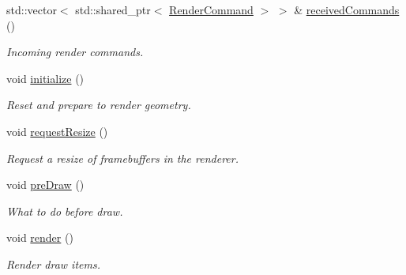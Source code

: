\begin{Indent}
\begin{DoxyCompactItemize}
\mbox{\label{classrev_1_1_main_renderer_a6b64ac62d7d411502a2ad07a2d9382f2}} 
std\+::vector$<$ std\+::shared\+\_\+ptr$<$ \mbox{\hyperlink{classrev_1_1_render_command}{Render\+Command}} $>$ $>$ \& \mbox{\hyperlink{classrev_1_1_main_renderer_a6b64ac62d7d411502a2ad07a2d9382f2}{received\+Commands}} ()
\begin{DoxyCompactList}\small\item\em Incoming render commands. \end{DoxyCompactList}\item 
\mbox{\label{classrev_1_1_main_renderer_ab9f5d1b5292ce45c0298a87463a9073e}} 
void \mbox{\hyperlink{classrev_1_1_main_renderer_ab9f5d1b5292ce45c0298a87463a9073e}{initialize}} ()
\begin{DoxyCompactList}\small\item\em Reset and prepare to render geometry. \end{DoxyCompactList}\item 
\mbox{\label{classrev_1_1_main_renderer_a73507819878d4870570d73689b68f543}} 
void \mbox{\hyperlink{classrev_1_1_main_renderer_a73507819878d4870570d73689b68f543}{request\+Resize}} ()
\begin{DoxyCompactList}\small\item\em Request a resize of framebuffers in the renderer. \end{DoxyCompactList}\item 
\mbox{\label{classrev_1_1_main_renderer_a48de9755d4873f4c031ee3ff19dff142}} 
void \mbox{\hyperlink{classrev_1_1_main_renderer_a48de9755d4873f4c031ee3ff19dff142}{pre\+Draw}} ()
\begin{DoxyCompactList}\small\item\em What to do before draw. \end{DoxyCompactList}\item 
\mbox{\label{classrev_1_1_main_renderer_a554f3098ef2bffec37e5fe2cd74c300b}} 
void \mbox{\hyperlink{classrev_1_1_main_renderer_a554f3098ef2bffec37e5fe2cd74c300b}{render}} ()
\begin{DoxyCompactList}\small\item\em Render draw items. \end{DoxyCompactList}\item 

\end{DoxyCompactItemize}
\end{Indent}
